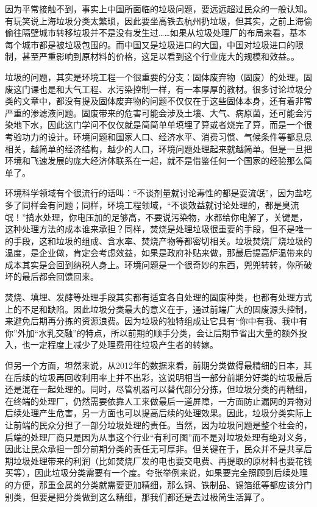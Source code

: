 \documentclass[
]{book}
\begin{document}
因为平常接触不到，事实上中国所面临的垃圾问题，要远远超过民众的一般认知。有玩笑说上海垃圾分类太繁琐，因此要坐高铁去杭州扔垃圾，但其实，之前上海偷偷往隔壁城市转移垃圾并不是没有发生过\ldots\ldots 如果从垃圾处理厂的布局来看，基本每个城市都是被垃圾包围的。而中国又是垃圾进口的大国，中国对垃圾进口的限制，甚至严重影响到原材料的价格，这足以看到这个行业庞大的规模和效益。。

垃圾的问题，其实是环境工程一个很重要的分支：固体废弃物（固废）的处理。固废这门课也是和大气工程、水污染控制一样，有一本厚厚的教材。很多讨论垃圾分类的文章中，都没有提及固体废弃物的问题不仅仅在于这些固体本身，还有着非常严重的渗滤液问题。固废带来的危害可能会涉及土壤、大气、病原菌，还可能会污染地下水，因此这门学问不仅仅就是简简单单填埋了算或者烧完了算，而是一个很考验功力的设计。环境问题和国家人口、经济水平、消费习惯、气候条件等都息息相关，越简单的经济结构，越少的人口，环境问题处理起来就越简单。但是一旦把环境和飞速发展的庞大经济体联系在一起，就不是借鉴任何一个国家的经验那么简单了。

环境科学领域有个很流行的话叫：``不谈剂量就讨论毒性的都是耍流氓''，因为盐吃多了同样会有问题；同样，环境工程领域，``不谈效益就讨论处理的，都是臭流氓！''搞水处理，你电压加的足够高，不要说污染物，水都给你电解了，关键是，这种处理方法的成本谁来承担？同样，焚烧是处理垃圾很重要的手段，但不是唯一的手段，这和垃圾的组成、含水率、焚烧产物等都密切相关。垃圾焚烧厂烧垃圾的温度，是企业做，肯定会考虑效益，如果是政府补贴来做，那最后提高炉温带来的成本其实是会回到纳税人身上。环境问题是一个很奇妙的东西，兜兜转转，你所破坏的最后都会回馈回来。

焚烧、填埋、发酵等处理手段其实都有适宜各自处理的固废种类，也都有处理方式上的不足和缺陷。因此垃圾分类最大的意义在于，通过前端广大的固废源头控制，来避免后期再分拣的资源浪费。因为垃圾的独特组成让它具有``你中有我、我中有你''外加``水乳交融''的特点，所以前期的顺手分类，会让后期节省出大量的额外投入，也一定程度上减少了处理费用往垃圾产生者的转嫁。

但另一个方面，坦然来说，从2012年的数据来看，前期分类做得最精细的日本，其在后续的垃圾再回收利用率上并不出彩，这说明相当一部分前期分好类的垃圾最后还是混在一起处理的。同时，尽管机器可以替代部分分拣，但垃圾分类的再精细，在终端的处理厂，仍然需要依靠人工来做最后一道屏障，一方面防止漏网的异物对后续处理产生危害，另一方面也可以提高后续的处理效果。因此，垃圾分类实际上让前端的民众分担了一部分垃圾处理的责任。当然，因为垃圾问题是整个社会的，后端的处理厂商只是因为从事这个行业``有利可图''而不是对垃圾处理有绝对义务，因此让民众承担一部分前期分类的责任无可厚非。但关键在于，民众并不是共享后期垃圾处理带来的利润（比如焚烧厂发的电也要交电费、再提取的原材料也要花钱买等），因此垃圾分类需要有一个度。夸张举例来说，如果要完全照顾到后续处理的方便，那重金属的分类就需要更加精细，那么铜、铁制品、锡箔纸等都应该分门别类，但要是把分类做到这么精细，那我们都还是去过极简生活算了。
\end{document}
